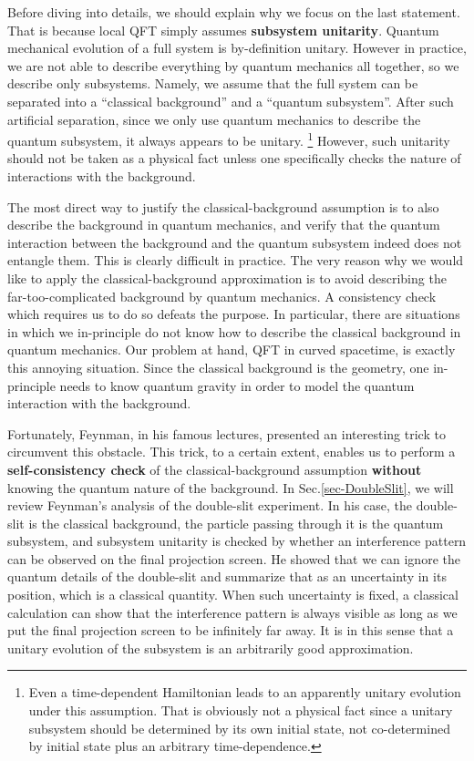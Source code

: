 \documentclass[aps,showpacs,twocolumn,floats,prd,superscriptaddress,nofootinbib]{revtex4-1}
\begin{document}
Before diving into details, we should explain why we focus on the last statement.
That is because local QFT simply assumes {\bf subsystem unitarity}.
Quantum mechanical evolution of a full system is by-definition unitary. 
However in practice, we are not able to describe everything by quantum mechanics all together, so we describe only subsystems. 
Namely, we assume that the full system can be separated into a ``classical background'' and a ``quantum subsystem''. 
After such artificial separation, since we only use quantum mechanics to describe the quantum subsystem, it always appears to be unitary.
\footnote{Even a time-dependent Hamiltonian leads to an apparently unitary evolution under this assumption. That is obviously not a physical fact since a unitary subsystem should be determined by its own initial state, not co-determined by initial state plus an arbitrary time-dependence.} 
However, such unitarity should not be taken as a physical fact unless one specifically checks the nature of interactions with the background.

The most direct way to justify the classical-background assumption is to also describe the background in quantum mechanics, and verify that the quantum interaction between the background and the quantum subsystem indeed does not entangle them. 
This is clearly difficult in practice. 
The very reason why we would like to apply the classical-background approximation is to avoid describing the far-too-complicated background by quantum mechanics. 
A consistency check which requires us to do so defeats the purpose. 
In particular, there are situations in which we in-principle do not know how to describe the classical background in quantum mechanics. 
Our problem at hand, QFT in curved spacetime, is exactly this annoying situation. 
Since the classical background is the geometry, one in-principle needs to know quantum gravity in order to model the quantum interaction with the background. 

Fortunately, Feynman, in his famous lectures, presented an interesting trick to circumvent this obstacle. 
This trick, to a certain extent, enables us to perform a {\bf self-consistency check} of the classical-background assumption {\bf without} knowing the quantum nature of the background.
In Sec.\ref{sec-DoubleSlit}, we will review Feynman's analysis of the double-slit experiment. 
In his case, the double-slit is the classical background, the particle passing through it is the quantum subsystem, and subsystem unitarity is checked by whether an interference pattern can be observed on the final projection screen. 
He showed that we can ignore the quantum details of the double-slit and summarize that as an uncertainty in its position, which is a classical quantity. 
When such uncertainty is fixed, a classical calculation can show that the interference pattern is always visible as long as we put the final projection screen to be infinitely far away. 
It is in this sense that a unitary evolution of the subsystem is an arbitrarily good approximation.
\end{document}
